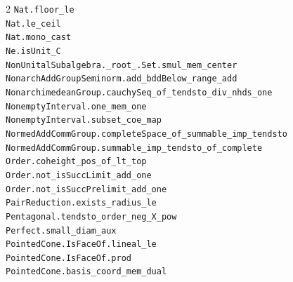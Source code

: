 \documentclass[10pt,a4paper]{article}
\begin{document}
\begin{multicols}{2}
\texttt{Nat.\allowbreak{}floor\_le} \\
\texttt{Nat.\allowbreak{}le\_ceil} \\
\texttt{Nat.\allowbreak{}mono\_cast} \\
\texttt{Ne.\allowbreak{}isUnit\_C} \\
\texttt{NonUnitalSubalgebra.\allowbreak{}\_root\_.\allowbreak{}Set.\allowbreak{}smul\_mem\_center} \\
\texttt{NonarchAddGroupSeminorm.\allowbreak{}add\_bddBelow\_range\_add} \\
\texttt{NonarchimedeanGroup.\allowbreak{}cauchySeq\_of\_tendsto\_div\_nhds\_one} \\
\texttt{NonemptyInterval.\allowbreak{}one\_mem\_one} \\
\texttt{NonemptyInterval.\allowbreak{}subset\_coe\_map} \\
\texttt{NormedAddCommGroup.\allowbreak{}completeSpace\_of\_summable\_imp\_tendsto} \\
\texttt{NormedAddCommGroup.\allowbreak{}summable\_imp\_tendsto\_of\_complete} \\
\texttt{Order.\allowbreak{}coheight\_pos\_of\_lt\_top} \\
\texttt{Order.\allowbreak{}not\_isSuccLimit\_add\_one} \\
\texttt{Order.\allowbreak{}not\_isSuccPrelimit\_add\_one} \\
\texttt{PairReduction.\allowbreak{}exists\_radius\_le} \\
\texttt{Pentagonal.\allowbreak{}tendsto\_order\_neg\_X\_pow} \\
\texttt{Perfect.\allowbreak{}small\_diam\_aux} \\
\texttt{PointedCone.\allowbreak{}IsFaceOf.\allowbreak{}lineal\_le} \\
\texttt{PointedCone.\allowbreak{}IsFaceOf.\allowbreak{}prod} \\
\texttt{PointedCone.\allowbreak{}basis\_coord\_mem\_dual} \\

\end{multicols}
\end{document}
